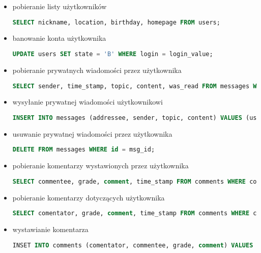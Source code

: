 \begin{itemize}
\item pobieranie listy użytkowników
\begin{lstlisting}[language=SQL]
SELECT nickname, location, birthday, homepage FROM users;
\end{lstlisting}

\item banowanie konta użytkownika
\begin{lstlisting}[language=SQL]
UPDATE users SET state = 'B' WHERE login = login_value;
\end{lstlisting}

\item pobieranie prywatnych wiadomości przez użytkownika
\begin{lstlisting}[language=SQL]
SELECT sender, time_stamp, topic, content, was_read FROM messages WHERE addressee = current_user;
\end{lstlisting}

\item wysyłanie prywatnej wiadomości użytkownikowi
\begin{lstlisting}[language=SQL]
INSERT INTO messages (addressee, sender, topic, content) VALUES (user_id, current_user, topic_value, content_value);
\end{lstlisting}

\item usuwanie prywatnej wiadomości przez użytkownika
\begin{lstlisting}[language=SQL]
DELETE FROM messages WHERE id = msg_id;
\end{lstlisting}

\item pobieranie komentarzy wystawionych przez użytkownika
\begin{lstlisting}[language=SQL]
SELECT commentee, grade, comment, time_stamp FROM comments WHERE comentator = user_id;
\end{lstlisting}

\item pobieranie komentarzy dotyczących użytkownika
\begin{lstlisting}[language=SQL]
SELECT comentator, grade, comment, time_stamp FROM comments WHERE commentee = user_id;
\end{lstlisting}

\item wystawianie komentarza
\begin{lstlisting}[language=SQL]
INSET INTO comments (comentator, commentee, grade, comment) VALUES (current_user, user_id, grade_value, comment_value);
\end{lstlisting}


\end{itemize}
